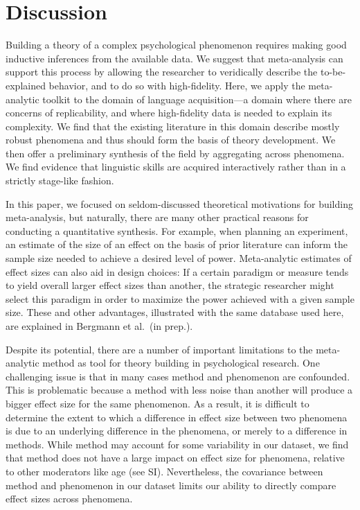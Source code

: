 \documentclass[english,floatsintext,man]{apa6}
\begin{document}
\section{Discussion}\label{discussion}

Building a theory of a complex psychological phenomenon requires making
good inductive inferences from the available data. We suggest that
meta-analysis can support this process by allowing the researcher to
veridically describe the to-be-explained behavior, and to do so with
high-fidelity. Here, we apply the meta-analytic toolkit to the domain of
language acquisition---a domain where there are concerns of
replicability, and where high-fidelity data is needed to explain its
complexity. We find that the existing literature in this domain describe
mostly robust phenomena and thus should form the basis of theory
development. We then offer a preliminary synthesis of the field by
aggregating across phenomena. We find evidence that linguistic skills
are acquired interactively rather than in a strictly stage-like fashion.

In this paper, we focused on seldom-discussed theoretical motivations
for building meta-analysis, but naturally, there are many other
practical reasons for conducting a quantitative synthesis. For example,
when planning an experiment, an estimate of the size of an effect on the
basis of prior literature can inform the sample size needed to achieve a
desired level of power. Meta-analytic estimates of effect sizes can also
aid in design choices: If a certain paradigm or measure tends to yield
overall larger effect sizes than another, the strategic researcher might
select this paradigm in order to maximize the power achieved with a
given sample size. These and other advantages, illustrated with the same
database used here, are explained in Bergmann et al.~(in prep.).

Despite its potential, there are a number of important limitations to
the meta-analytic method as tool for theory building in psychological
research. One challenging issue is that in many cases method and
phenomenon are confounded. This is problematic because a method with
less noise than another will produce a bigger effect size for the same
phenomenon. As a result, it is difficult to determine the extent to
which a difference in effect size between two phenomena is due to an
underlying difference in the phenomena, or merely to a difference in
methods. While method may account for some variability in our dataset,
we find that method does not have a large impact on effect size for
phenomena, relative to other moderators like age (see SI). Nevertheless,
the covariance between method and phenomenon in our dataset limits our
ability to directly compare effect sizes across phenomena.
\end{document}
